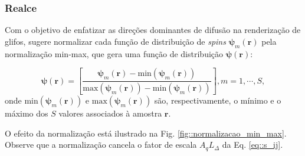 \documentclass[
    12pt,                %
    oneside,            %
    a4paper,            %
    english,            %
    french,                %
    spanish,            %
    brazil                %
    ]{abntex2}
\begin{document}
\subsubsection{Realce}

Com o objetivo de enfatizar as direções dominantes de difusão na renderização de glifos,  sugere normalizar cada função de distribuição de \textit{spins} $\boldsymbol{\psi}_m(\mathbf{r})$ pela normalização min-max, que gera uma função de distribuição $\boldsymbol{\psi}(\mathbf{r})$: 

\begin{equation}
\label{eq::SDF2dODF}
    \boldsymbol{\psi}(\mathbf{r}) = [ \frac{\boldsymbol{\psi}_m(\mathbf{r}) - \text{min}(\boldsymbol{\psi}_m(\mathbf{r}))}{\text{max}(\boldsymbol{\psi}_m(\mathbf{r})) - \text{min}(\boldsymbol{\psi}_m(\mathbf{r}))}], m = 1, \cdots, S ,
\end{equation}
onde $\text{min}(\boldsymbol{\psi}_m(\mathbf{r}))$ e $\text{max}(\boldsymbol{\psi}_m(\mathbf{r}))$ são, respectivamente, o mínimo e o máximo dos $S$ valores associados à amostra $\mathbf{r}$.

O efeito da normalização está ilustrado na Fig. \ref{fig::normalizacao_min_max}. Observe que a normalização cancela o fator de escala $A_qL_{\Delta}$ da Eq. \ref{eq::s_ij}.

\end{document}

